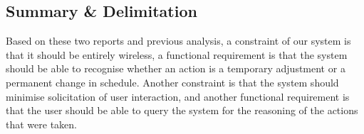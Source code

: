 \subsection{Summary \& Delimitation}
Based on these two reports and previous analysis, a constraint of our system is that it should be entirely wireless, a functional requirement is that the system should be able to recognise whether an action is a temporary adjustment or a permanent change in schedule. Another constraint is that the system should minimise solicitation of user interaction, and another functional requirement is that the user should be able to query the system for the reasoning of the actions that were taken.

